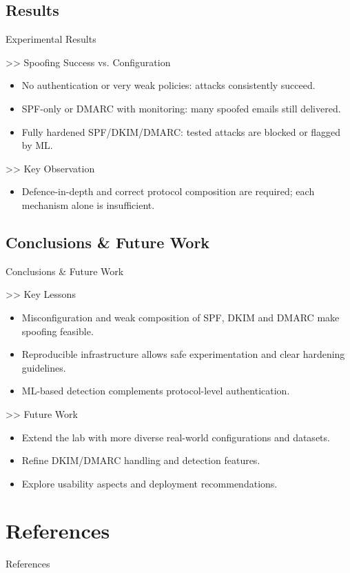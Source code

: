 \documentclass[aspectratio=169,10pt]{beamer}
\begin{document}
\subsection{Results}
\begin{frame}{Experimental Results}
  \transdissolve
  \begin{block}{>> Spoofing Success vs. Configuration}
  \begin{itemize}
    \item No authentication or very weak policies: attacks consistently succeed.
    \item SPF-only or DMARC with monitoring: many spoofed emails still delivered.
    \item Fully hardened SPF/DKIM/DMARC: tested attacks are blocked or flagged by ML.
  \end{itemize}
  \end{block}
  \vfill
  \begin{block}{>> Key Observation}
  \begin{itemize}
    \item Defence-in-depth and correct protocol composition are required; each mechanism alone is insufficient.
  \end{itemize}
  \end{block}
\end{frame}

\subsection{Conclusions \& Future Work}
\begin{frame}{Conclusions \& Future Work}
  \transdissolve
  \begin{block}{>> Key Lessons}
  \begin{itemize}
    \item Misconfiguration and weak composition of SPF, DKIM and DMARC make spoofing feasible.
    \item Reproducible infrastructure allows safe experimentation and clear hardening guidelines.
    \item ML-based detection complements protocol-level authentication.
  \end{itemize}
  \end{block}
  \vfill
  \begin{block}{>> Future Work}
  \begin{itemize}
    \item Extend the lab with more diverse real-world configurations and datasets.
    \item Refine DKIM/DMARC handling and detection features.
    \item Explore usability aspects and deployment recommendations.
  \end{itemize}
  \end{block}
\end{frame}

\section{References}

\begin{frame}[allowframebreaks]{References}
  \transdissolve
  	\nocite{*}
	
	
\end{frame}
\end{document}
